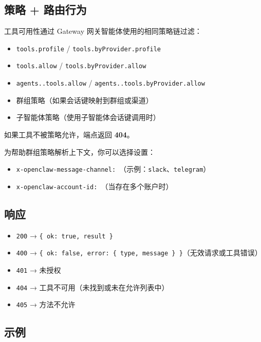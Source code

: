 \subsection{策略 + 路由行为}


工具可用性通过 Gateway 网关智能体使用的相同策略链过滤：

\begin{itemize}
  \item \texttt{tools.profile} / \texttt{tools.byProvider.profile}
  \item \texttt{tools.allow} / \texttt{tools.byProvider.allow}
  \item \texttt{agents..tools.allow} / \texttt{agents..tools.byProvider.allow}
  \item 群组策略（如果会话键映射到群组或渠道）
  \item 子智能体策略（使用子智能体会话键调用时）
\end{itemize}


如果工具不被策略允许，端点返回 \textbf{404}。

为帮助群组策略解析上下文，你可以选择设置：

\begin{itemize}
  \item \texttt{x-openclaw-message-channel: }（示例：\texttt{slack}、\texttt{telegram}）
  \item \texttt{x-openclaw-account-id: }（当存在多个账户时）
\end{itemize}


\subsection{响应}


\begin{itemize}
  \item \texttt{200} → \texttt{\{ ok: true, result \}}
  \item \texttt{400} → \texttt{\{ ok: false, error: \{ type, message \} \}}（无效请求或工具错误）
  \item \texttt{401} → 未授权
  \item \texttt{404} → 工具不可用（未找到或未在允许列表中）
  \item \texttt{405} → 方法不允许
\end{itemize}


\subsection{示例}


